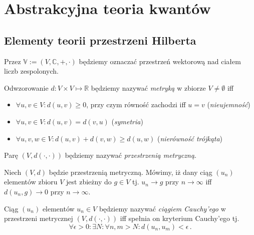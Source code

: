 \documentclass{myclass}
\author{Bartosz Hanc}
\begin{document}
\tableofcontents

\section{Abstrakcyjna teoria kwantów}

\subsection{Elementy teorii przestrzeni Hilberta}

Przez \(\mathbb{V} := (V,\mathbb{C},+,\cdot)\) będziemy oznaczać przestrzeń wektorową nad ciałem
liczb zespolonych.

\begin{definition}
Odwzorowanie \(d: V \times V \mapsto \mathbb{R}\) będziemy nazywać \textit{metryką} w zbiorze \(V
\neq \emptyset\) iff
\begin{itemize}

\item \(\forall u,v \in V : d(u,v) \geq 0\), przy czym równość zachodzi iff \(u = v\)
(\textit{nieujemność})

\item \(\forall u,v \in V : d(u,v) = d(v,u)\) (\textit{symetria})

\item \(\forall u,v,w \in V : d(u,v) + d(v,w) \geq d(u,w)\) (\textit{nierówność trójkąta})

\end{itemize}
Parę \((V,d(\cdot,\cdot))\) będziemy nazywać \textit{przestrzenią metryczną}.
\end{definition}

\begin{definition}
Niech \((V,d)\) będzie przestrzenią metryczną. Mówimy, iż dany ciąg \((u_n)\) elementów zbioru \(V\)
jest zbieżny do \(g\in V\) tj. \(u_n \to g\) przy \(n \to \infty\) iff \(d(u_n,g) \to 0\) przy \(n
\to \infty\).   
\end{definition}

\begin{definition}
Ciąg \((u_n)\) elementów \(u_n \in V\) będziemy nazywać \textit{ciągiem Cauchy'ego} w przestrzeni
metrycznej \((V,d(\cdot,\cdot))\) iff spełnia on kryterium Cauchy'ego tj.
\begin{equation*}
    \forall \epsilon > 0 : \exists N : \forall n,m > N : d(u_n,u_m) < \epsilon\,.
\end{equation*}  
\end{definition}
\end{document}
